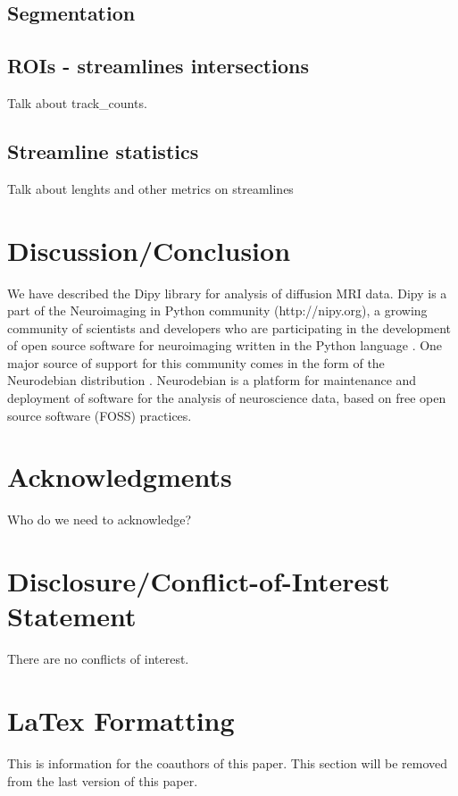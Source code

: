 \documentclass{bioinfo}
\begin{document}
\subsection{Segmentation}

\subsection{ROIs - streamlines intersections}

Talk about track\_counts.

\subsection{Streamline statistics}

Talk about lenghts and other metrics on streamlines

\section{Discussion/Conclusion}

We have described the Dipy library for analysis of diffusion MRI data. Dipy is a part of the Neuroimaging in Python community (http://nipy.org), a growing community of scientists and developers who are participating in the development of open source software for neuroimaging written in the Python language  . One major source of support for this community comes in the form of the Neurodebian distribution \citep{Halchenko2012}. Neurodebian is a platform for maintenance and deployment of software for the analysis of neuroscience data, based on free open source software (FOSS) practices.

\section*{Acknowledgments}
Who do we need to acknowledge?

\section*{Disclosure/Conflict-of-Interest Statement}
There are no conflicts of interest.

\section{LaTex Formatting}

This is information for the coauthors of this paper. This section will be removed from the last version of this paper.
\end{document}
